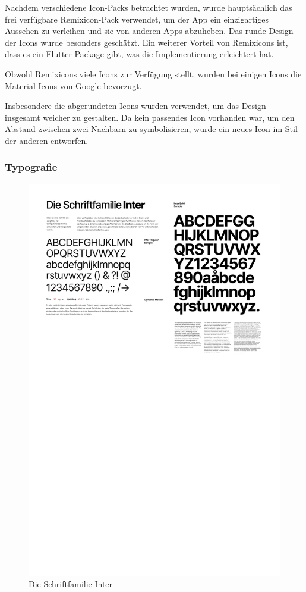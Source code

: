 Nachdem verschiedene Icon-Packs betrachtet wurden, wurde hauptsächlich das frei verfügbare Remixicon-Pack\cite{remixicon} verwendet, um der App ein einzigartiges Aussehen zu verleihen und sie von anderen Apps abzuheben. Das runde Design der Icons wurde besonders geschätzt. Ein weiterer Vorteil von Remixicons ist, dass es ein Flutter-Package\cite{remixicon_flutter_package} gibt, was die Implementierung erleichtert hat.

Obwohl Remixicons viele Icons zur Verfügung stellt, wurden bei einigen Icons die Material Icons\cite{material_icons} von Google bevorzugt.

Insbesondere die abgerundeten Icons wurden verwendet, um das
Design insgesamt weicher zu gestalten. Da kein passendes
Icon vorhanden war, um den Abstand zwischen zwei Nachbarn zu
symbolisieren, wurde ein neues Icon im Stil der anderen
entworfen.

\subsubsection{Typografie}
\begin{figure}[H]
  \centering
  \includegraphics[width=1\textwidth]{pics/font.png}
  \caption{Die Schriftfamilie Inter}
  \label{fig:font}
\end{figure}

